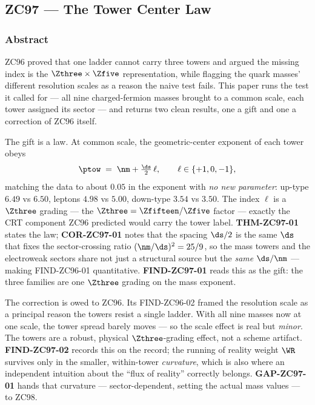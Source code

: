 \documentclass[12pt, a4paper]{article}
\begin{document}


\subsection{ZC97 --- The Tower Center Law}
\subsubsection*{Abstract}
\sloppy
ZC96 proved that one ladder cannot carry three towers and argued the missing
index is the $\Zthree\times\Zfive$ representation, while flagging the quark
masses' different resolution scales as a reason the naive test fails. This paper
runs the test it called for --- all nine charged-fermion masses brought to a
common scale, each tower assigned its sector --- and returns two clean results,
one a gift and one a correction of ZC96 itself.

The gift is a law. At common scale, the geometric-center exponent of each tower
obeys
\[
  \ptow \;=\; \nm + \tfrac{\ds}{2}\,\ell, \qquad \ell\in\{+1,0,-1\},
\]
matching the data to about $0.05$ in the exponent with \emph{no new parameter}:
up-type $6.49$ vs $6.50$, leptons $4.98$ vs $5.00$, down-type $3.54$ vs $3.50$.
The index $\ell$ is a $\Zthree$ grading --- the $\Zthree=\Zfifteen/\Zfive$
factor --- exactly the CRT component ZC96 predicted would carry the tower label.
\textbf{THM-ZC97-01} states the law; \textbf{COR-ZC97-01} notes that the spacing
$\ds/2$ is the same $\ds$ that fixes the sector-crossing ratio
$(\nm/\ds)^2=25/9$, so the mass towers and the electroweak sectors share not
just a structural source but the \emph{same} $\ds/\nm$ --- making FIND-ZC96-01
quantitative. \textbf{FIND-ZC97-01} reads this as the gift: the three families
are one $\Zthree$ grading on the mass exponent.

The correction is owed to ZC96. Its FIND-ZC96-02 framed the resolution scale as
a principal reason the towers resist a single ladder. With all nine masses now
at one scale, the tower spread barely moves --- so the scale effect is real but
\emph{minor}. The towers are a robust, physical $\Zthree$-grading effect, not a
scheme artifact. \textbf{FIND-ZC97-02} records this on the record; the running
of reality weight $\WR$ survives only in the smaller, within-tower
\emph{curvature}, which is also where an independent intuition about the
``flux of reality'' correctly belongs. \textbf{GAP-ZC97-01} hands that
curvature --- sector-dependent, setting the actual mass values --- to ZC98.
\end{document}
